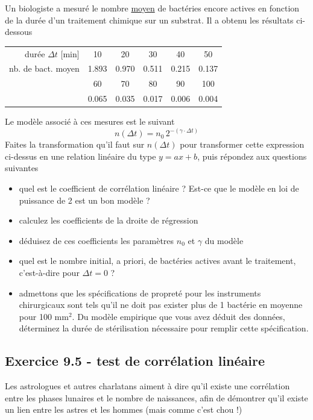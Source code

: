 Un biologiste a mesuré le nombre \underline{moyen} de bactéries encore actives en fonction de la durée d'un traitement chimique sur un substrat. Il a obtenu les résultats ci-dessous
\begin{center}
    \begin{tabular}{r|ccccc}
        durée $\Delta t$ [min] & 10    & 20    & 30    & 40    & 50    \\
        nb. de bact. moyen     & 1.893 & 0.970 & 0.511 & 0.215 & 0.137 \\
                               & 60    & 70    & 80    & 90    & 100   \\
                               & 0.065 & 0.035 & 0.017 & 0.006 & 0.004
    \end{tabular}
\end{center}
Le modèle associé à ces mesures est le suivant
$$
    n(\Delta t)=n_0\,2^{-(\gamma\cdot\Delta t)}
$$
Faites la transformation qu'il faut sur $n(\Delta t)$ pour transformer cette expression ci-dessus en une relation linéaire du type $y=ax+b$, puis répondez aux questions suivantes
\begin{itemize}
    \item quel est le coefficient de corrélation linéaire ? Est-ce que le modèle en loi de puissance de 2 est un bon modèle ?
    \item calculez les coefficients de la droite de régression
    \item déduisez de ces coefficients les paramètres $n_0$ et $\gamma$ du modèle
    \item quel est le nombre initial, a priori, de bactéries actives avant le traitement, c'est-à-dire pour $\Delta t=0$ ?
    \item admettons que les spécifications de propreté pour les instruments chirurgicaux sont tels qu'il ne doit pas exister plus de 1 bactérie en moyenne pour 100 mm$^2$. Du modèle empirique que vous avez déduit des données, déterminez la durée de stérilisation nécessaire pour remplir cette spécification.
\end{itemize}

\subsection*{Exercice 9.5 - test de corrélation linéaire}

Les astrologues et autres charlatans aiment à dire qu'il existe une corrélation entre les phases lunaires et le nombre de naissances, afin de démontrer qu'il existe un lien entre les astres et les hommes (mais comme c'est chou !)

